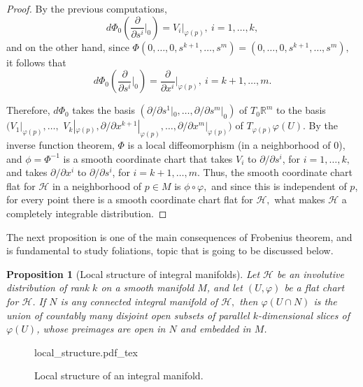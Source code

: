 \documentclass[12pt, letterpaper, reqno]{amsart}
\newcommand{\incfig}[2][1]{%
    \def\svgwidth{#1\columnwidth}
    {#2.pdf_tex}
}
\theoremstyle{definition}
\theoremstyle{plain}
\newtheorem{prop}{Proposition}
\theoremstyle{remark}
\begin{document}
\begin{proof}
	By the previous computations, $$ d\Phi_0\left( \frac{\partial}{\partial s^i}\Big|_{0} \right) = V_i |_{\varphi(p)}, \ i=1,\dots,k, $$ and on the other hand, since $ \Phi(0,\dots,0,s^{k+1},\dots,s^m)=(0,\dots,0,s^{k+1},\dots,s^m), $ it follows that
	$$ d\Phi_0 \left( \frac{\partial}{\partial s^i}\Big|_{0}  \right) = \frac{\partial}{\partial x^i}\Big|_{\varphi(p)},\ i=k+1,\dots,m.  $$ 
	
	Therefore, $ d\Phi_0 $ takes the basis $ \left( \partial/\partial s^1 |_0,\dots,\partial/\partial s^m |_0 \right) $ of $ T_0 \mathbb{R}^m $ to the basis $ ( V_1|_{\varphi(p)},  \dots,$ $ V_k|_{\varphi(p)}, \partial/\partial x^{k+1}|_{\varphi(p)}, \dots, \partial/\partial x^{m}|_{\varphi(p)}) $ of $ T_{\varphi(p)} \varphi(U). $ By the inverse function theorem, $ \Phi $ is a local diffeomorphism (in a neighborhood of $ 0 $), and $ \phi=\Phi^{-1} $ is a smooth coordinate chart that takes $ V_i $ to $ \partial/\partial s^i $, for $ i=1,\dots,k, $ and takes $ \partial / \partial x^{i} $ to $ \partial/\partial s^i $, for $ i=k+1,\dots,m. $ Thus, the smooth coordinate chart flat for $ \mathcal{H} $ in a neighborhood of $ p\in M $ is $ \phi\circ\varphi, $ and since this is independent of $ p $, for every point there is a smooth coordinate chart flat for $ \mathcal{H}, $ what makes $ \mathcal{H} $ a completely integrable distribution.

\end{proof}

The next proposition is one of the main consequences of Frobenius theorem, and is fundamental to study foliations, topic that is going to be discussed below.
\begin{prop}[Local structure of integral manifolds]\label{prop:local_structure}
	Let $ \mathcal{H} $ be an involutive distribution of rank $ k $ on a smooth manifold $ M $, and let $ (U,\varphi) $ be a flat chart for $ \mathcal{H} $. If $ N $ is any connected integral manifold of $ \mathcal{H}, $ then $ \varphi(U\cap N) $ is the union of countably many disjoint open subsets of parallel $ k $-dimensional slices of $ \varphi(U) $, whose preimages are open in $ N $ and embedded in $ M $.
\end{prop}

\begin{figure}
    \centering
    \incfig{local_structure}
    \caption{Local structure of an integral manifold.}
    \label{fig:local_structure}
\end{figure}
\end{document}
